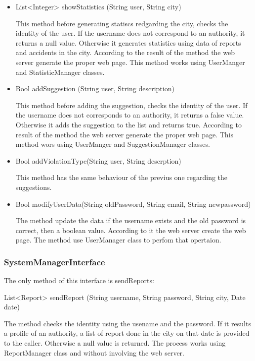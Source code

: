 \begin{itemize}
	 \item
	List<Integer> showStatistics (String user, String city)
	
	This method before generating statiscs redgarding the city, checks the identity of the user. 
	If the username does not correspond to an authority, it returns a null value.
	Otherwise it generates statistics using data of reports and accidents in the city.
	According to the result of the method the web server generate the proper web page.
	This method works using UserManger and StatisticManager classes.
	
	\item 
	Bool addSuggestion (String user, String description)
	
	This method before adding the suggestion, checks the identity of the user. 
	If the username does not corresponds to an authority, it returns a false value.
	Otherwise it adds the suggestion to the list and returns true.
	According to result of the method the web server generate the proper web page.
	This method wors using UserManger and SuggestionManager classes.
	
	\item 
	Bool addViolationType(String user, String descrption)
	
	This method has the same behaviour of the previus one regarding the suggestions.
	
	\item 
	Bool modifyUserData(String oldPassword, String email, String newpassword)
	
	The method update the data if the username exists and the old password is correct, then
	a boolean value. According to it the web server create the web page.
	The method use UserManager class to perfom that opertaion.
\end{itemize}

\subsubsection{SystemManagerInterface}

The only method of this interface is sendReports:
\hfill

List<Report> sendReport (String username, String password, String city, Date date)



The method checks the identity using the usename and the password. If it results a profile of an authority, a list of report done in the city on that date is provided to the caller. Otherwise a null value is returned.
The process works using ReportManager class and without involving the web server.






